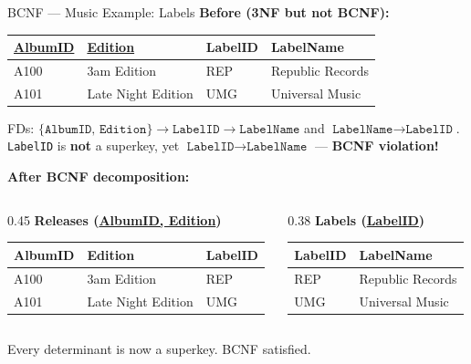 \begin{frame}{BCNF --- Music Example: Labels}
  \textbf{Before (3NF but not BCNF):}

  \vspace{4pt}
  \small
  \begin{center}
  \begin{tabular}{llll}
    \toprule
    \textbf{\underline{AlbumID}} & \textbf{\underline{Edition}} & \textbf{LabelID} & \textbf{LabelName} \\
    \midrule
    A100 & 3am Edition        & REP & Republic Records \\
    A101 & Late Night Edition & UMG & Universal Music  \\
    \bottomrule
  \end{tabular}
  \end{center}
  \normalsize

  \vspace{4pt}
  FDs: $\{\texttt{AlbumID, Edition}\} \to \texttt{LabelID} \to \texttt{LabelName}$
  and $\texttt{LabelName} \to \texttt{LabelID}$.\\
  \texttt{LabelID} is \textbf{not} a superkey, yet $\texttt{LabelID} \to \texttt{LabelName}$
  --- \textbf{BCNF violation!}

  \vspace{6pt}
  \textbf{After BCNF decomposition:}

  \begin{columns}[t]
    \begin{column}{0.45\textwidth}
      \small\textbf{Releases (\underline{AlbumID, Edition})}
      \begin{tabular}{lll}
        \toprule
        \textbf{AlbumID} & \textbf{Edition} & \textbf{LabelID} \\
        \midrule
        A100 & 3am Edition        & REP \\
        A101 & Late Night Edition & UMG \\
        \bottomrule
      \end{tabular}
    \end{column}
    \begin{column}{0.38\textwidth}
      \small\textbf{Labels (\underline{LabelID})}
      \begin{tabular}{ll}
        \toprule
        \textbf{LabelID} & \textbf{LabelName} \\
        \midrule
        REP & Republic Records \\
        UMG & Universal Music  \\
        \bottomrule
      \end{tabular}
    \end{column}
  \end{columns}

  \vspace{4pt}
  \normalsize Every determinant is now a superkey. BCNF satisfied. \checkmark
\end{frame}

